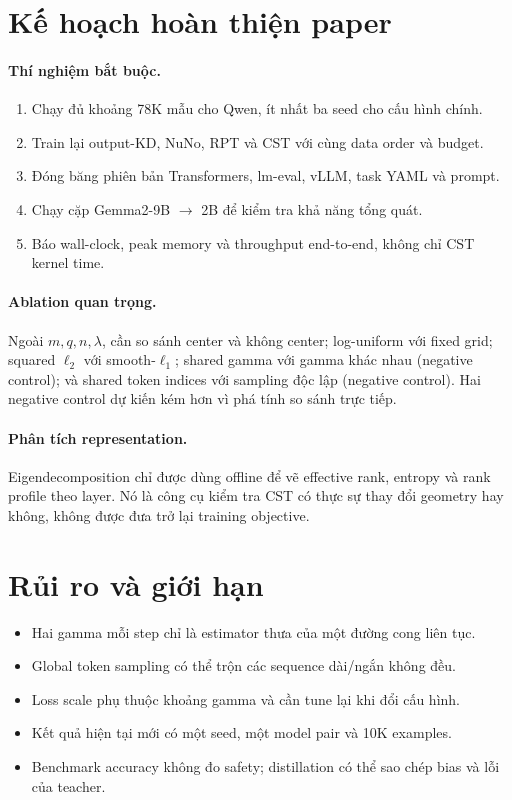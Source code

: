 \documentclass{article}
\begin{document}
\section{Kế hoạch hoàn thiện paper}

\paragraph{Thí nghiệm bắt buộc.}
\begin{enumerate}
 \item Chạy đủ khoảng 78K mẫu cho Qwen, ít nhất ba seed cho cấu hình chính.
 \item Train lại output-KD, NuNo, RPT và CST với cùng data order và budget.
 \item Đóng băng phiên bản Transformers, lm-eval, vLLM, task YAML và prompt.
 \item Chạy cặp Gemma2-9B $\rightarrow$ 2B để kiểm tra khả năng tổng quát.
 \item Báo wall-clock, peak memory và throughput end-to-end, không chỉ CST
 kernel time.
\end{enumerate}

\paragraph{Ablation quan trọng.}
Ngoài $m,q,n,\lambda$, cần so sánh center và không center; log-uniform với fixed
grid; squared $\ell_2$ với smooth-$\ell_1$; shared gamma với gamma khác nhau
(negative control); và shared token indices với sampling độc lập (negative
control).  Hai negative control dự kiến kém hơn vì phá tính so sánh trực tiếp.

\paragraph{Phân tích representation.}
Eigendecomposition chỉ được dùng offline để vẽ effective rank, entropy và rank
profile theo layer.  Nó là công cụ kiểm tra CST có thực sự thay đổi geometry
hay không, không được đưa trở lại training objective.

\section{Rủi ro và giới hạn}

\begin{itemize}
 \item Hai gamma mỗi step chỉ là estimator thưa của một đường cong liên tục.
 \item Global token sampling có thể trộn các sequence dài/ngắn không đều.
 \item Loss scale phụ thuộc khoảng gamma và cần tune lại khi đổi cấu hình.
 \item Kết quả hiện tại mới có một seed, một model pair và 10K examples.
 \item Benchmark accuracy không đo safety; distillation có thể sao chép bias và
 lỗi của teacher.
\end{itemize}
\end{document}
